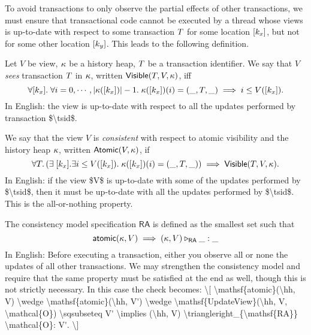 To avoid transactions to only observe the partial effects of other transactions, we 
must ensure that transactional code cannot be executed by a thread whose 
views is up-to-date with respect to some transaction $\tsid$ for some location $[k_x]$, 
but not for some other location $[k_y]$. This leads to the following definition.
\begin{definition}
\label{def:readatomic}
Let $V$ be  view, $\kappa$ be a history heap, $\tsid$ be a transaction identifier. 
We say that $V$ \emph{sees} transaction $\tsid$ in $\kappa$, written 
$\mathsf{Visible}(T, V, \kappa)$, iff 
\[
\forall [k_x].\;\forall i=0,\cdots, \lvert \kappa([k_x]) \rvert -1.\;\kappa([k_x])(i) = 
(\_, T, \_) \implies i \leq V([k_x]).
\]
\ac{In English: the view is up-to-date with respect to all the updates 
performed by transaction $\tsid$.}

We say that the view $V$ is \emph{consistent} with respect to atomic 
visibility and the history heap $\kappa$,  written $\mathsf{Atomic}(V, \kappa)$, 
if
\[
\forall T. \left( \exists\;[k_x]. \exists i \leq V([k_x]).\; \kappa([k_x])(i) = (\_, T, \_) 
\right) \implies \mathsf{Visible}(T, V, \kappa).
\]
\ac{In English: if the view $V$ is up-to-date with some of the updates performed 
by $\tsid$, then it must be up-to-date with all the updates performed by $\tsid$. 
This is the all-or-nothing property.}

The consistency model specification $\mathsf{RA}$ is defined as the smallest set such that  
\[
\mathsf{atomic}(\kappa, V) \implies (\kappa, V) \triangleright_{\mathsf{RA}} \_: \_
\]
\ac{In English: Before executing a transaction, either you observe all or none the 
updates of all other transactions. We may strengthen the consistency model and 
require that the same property must be satisfied at the end as well, though 
this is not strictly necessary. In this case the check becomes: 
\[
\mathsf{atomic}(\hh, V) \wedge \mathsf{atomic}(\hh, V') \wedge \mathsf{UpdateView}(\hh, V, \mathcal{O}) 
\sqsubseteq V' \implies (\hh, V) \triangleright_{\mathsf{RA}} \mathcal{O}: V'.
\]
}
%
\end{definition}

